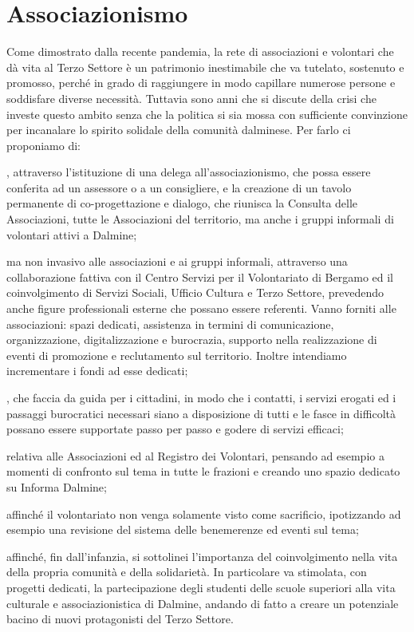 \section{Associazionismo}
Come dimostrato dalla recente pandemia, la rete di associazioni e volontari che dà vita al Terzo Settore è un patrimonio inestimabile che va tutelato, sostenuto e promosso, perché in grado di raggiungere in modo capillare numerose persone e soddisfare diverse necessità. Tuttavia sono anni che si discute della crisi che investe questo ambito senza che la politica si sia mossa con sufficiente convinzione per incanalare lo spirito solidale della comunità dalminese.
Per farlo ci proponiamo di:

, attraverso l'istituzione di una delega all'associazionismo, che possa essere conferita ad un assessore o a un consigliere, e la creazione di un tavolo permanente di co-progettazione e dialogo, che riunisca la Consulta delle Associazioni, tutte le Associazioni del territorio, ma anche i gruppi informali di volontari attivi a Dalmine;

 ma non invasivo alle associazioni e ai gruppi informali, attraverso una collaborazione fattiva con il Centro Servizi per il Volontariato di  Bergamo ed il coinvolgimento di Servizi Sociali, Ufficio Cultura e Terzo Settore, prevedendo anche figure professionali esterne che possano essere referenti. Vanno forniti alle associazioni: spazi dedicati, assistenza in termini di comunicazione, organizzazione, digitalizzazione e burocrazia, supporto nella realizzazione di eventi di promozione e reclutamento sul territorio. Inoltre intendiamo incrementare i fondi ad esse dedicati;

, che faccia da guida per i cittadini, in modo che i contatti, i servizi erogati ed i passaggi burocratici necessari siano a disposizione di tutti e le fasce in difficoltà possano essere supportate passo per passo e godere di servizi efficaci;

 relativa alle Associazioni ed al Registro dei Volontari, pensando ad esempio a momenti di confronto sul tema in tutte le frazioni e creando uno spazio dedicato su Informa Dalmine;

 affinché il volontariato non venga solamente visto come sacrificio, ipotizzando ad esempio una revisione del sistema delle benemerenze ed eventi sul tema;

 affinché, fin dall'infanzia, si sottolinei l'importanza del coinvolgimento nella vita della propria comunità e della solidarietà. In particolare va stimolata, con progetti dedicati, la partecipazione degli studenti delle scuole superiori alla vita culturale e associazionistica di Dalmine, andando di fatto a creare un potenziale bacino di nuovi protagonisti del Terzo Settore.
